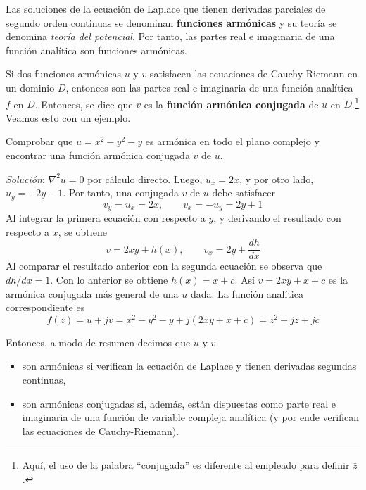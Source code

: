 Las soluciones de la ecuación de Laplace que tienen derivadas parciales de segundo orden continuas se denominan \textbf{funciones armónicas} y su teoría se denomina \textit{teoría del potencial}. Por tanto, las partes real e imaginaria de una función analítica son funciones armónicas.

Si dos funciones armónicas $u$ y $v$ satisfacen las ecuaciones de Cauchy-Riemann en un dominio $D$, entonces son las partes real e imaginaria de una función analítica $f$ en $D$. Entonces, se dice que $v$ es la \textbf{función armónica conjugada} de $u$ en $D$.\footnote{Aquí, el uso de la palabra ``conjugada'' es diferente al empleado para definir $\bar{z}$.} Veamos esto con un ejemplo.

\begin{example}
  Comprobar que $u=x^2-y^2 -y$ es armónica en todo el plano complejo y encontrar una función armónica conjugada $v$ de $u$.

  \textit{Solución}: $\nabla^2 u =0$ por cálculo directo. Luego, $u_x=2x$, y por otro lado, $u_y=-2y-1$. Por tanto, una conjugada $v$ de $u$ debe satisfacer
  \begin{equation*}
    v_y = u_x = 2x,\qquad v_x=-u_y = 2y+1
  \end{equation*}
  Al integrar la primera ecuación con respecto a $y$, y derivando el resultado con respecto a $x$, se obtiene
  \begin{equation*}
    v=2xy + h(x), \qquad v_x = 2y + \frac{dh}{dx}
  \end{equation*}
  Al comparar el resultado anterior con la segunda ecuación se observa que $dh/dx=1$. Con lo anterior se obtiene $h(x)=x+c$. Así $v=2xy+x+c$ es la armónica conjugada más general de una $u$ dada. La función analítica correspondiente es
  \[
    f(z)=u+jv=x^2-y^2-y+j(2xy+x+c)=z^2 +jz +jc
  \]
\end{example}

Entonces, a modo de resumen decimos que $u$ y $v$
\begin{itemize}
  \item son armónicas si verifican la ecuación de Laplace y tienen derivadas segundas continuas,
  \item son armónicas conjugadas si, además, están dispuestas como parte real e imaginaria de una función de variable compleja analítica (y por ende verifican las ecuaciones de Cauchy-Riemann).
\end{itemize}
